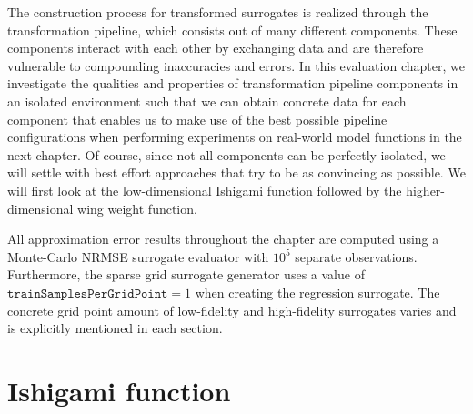 \documentclass[
  a4paper,  %
  twoside,  %
  bibliography=totoc,
  headsepline,
  cleardoublepage=empty,
  parskip=half,
  draft=false
]{scrbook}
\begin{document}
The construction process for transformed surrogates is realized through the transformation pipeline, which consists out of many different components.
These components interact with each other by exchanging data and are therefore vulnerable to compounding inaccuracies and errors.
In this evaluation chapter, we investigate the qualities and properties of transformation pipeline components in an isolated environment such that we can obtain concrete data for each component that enables us to make use of the best possible pipeline configurations when performing experiments on real-world model functions in the next chapter.
Of course, since not all components can be perfectly isolated, we will settle with best effort approaches that try to be as convincing as possible.
We will first look at the low-dimensional Ishigami function followed by the higher-dimensional wing weight function.

All approximation error results throughout the chapter are computed using a Monte-Carlo NRMSE surrogate evaluator with $10^5$ separate observations.
Furthermore, the sparse grid surrogate generator uses a value of $\texttt{trainSamplesPerGridPoint}=1$ when creating the regression surrogate.
The concrete grid point amount of low-fidelity and high-fidelity surrogates varies and is explicitly mentioned in each section.

\section{Ishigami function}
\end{document}
